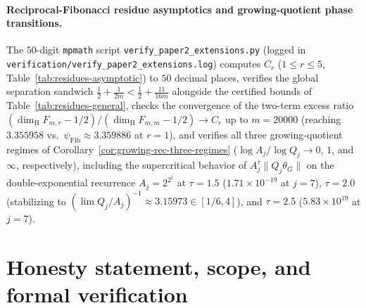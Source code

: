 \documentclass[11pt]{article}
\theoremstyle{definition}
\theoremstyle{remark}
\newcommand{\dimH}{\dim_{\mathrm{H}}}
\begin{document}
\paragraph{Reciprocal-Fibonacci residue asymptotics and growing-quotient phase transitions.}
The $50$-digit \texttt{mpmath} script
\texttt{verify\_\allowbreak paper2\_\allowbreak extensions.py} (logged in
\texttt{verification/\allowbreak verify\_\allowbreak paper2\_\allowbreak extensions.log})
computes $C_r$ ($1\le r\le 5$, Table~\ref{tab:residues-asymptotic}) to $50$ decimal
places, verifies the global separation sandwich
$\frac12+\frac{1}{2m}<\frac12+\frac{11}{16m}$ alongside the certified bounds of
Table~\ref{tab:residues-general}, checks the convergence of the two-term
excess ratio $(\dimH F_{m,r}-1/2)/(\dimH F_{m,m}-1/2)\to C_r$ up to $m=20000$
(reaching $3.355958$ vs.\ $\psi_{\mathrm{Fib}}\approx3.359886$ at $r=1$), and
verifies all three growing-quotient regimes of
Corollary~\ref{cor:growing-rec-three-regimes} ($\log A_j/\log Q_j\to 0$, $1$,
and $\infty$, respectively), including the supercritical behavior of
$A_j^\tau\|Q_j\theta_G\|$ on the double-exponential recurrence $A_j=2^{2^j}$ at
$\tau=1.5$ ($1.71\times10^{-19}$ at $j=7$), $\tau=2.0$ (stabilizing to
$(\lim Q_j/A_j)^{-1}\approx 3.15973\in[1/6,4]$), and $\tau=2.5$
($5.83\times10^{19}$ at $j=7$).

\section{Honesty statement, scope, and formal verification}\label{sec:verification}
\end{document}
